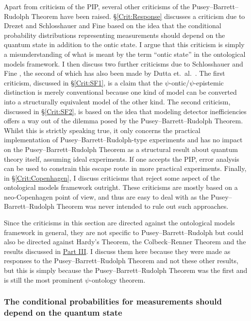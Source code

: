 \documentclass[DIV=calc,paper=a4,fontsize=11pt,twocolumn]{scrartcl} %
\theoremstyle{definition}
\theoremstyle{plain}
\begin{document}
Apart from criticism of the PIP, several other criticisms of the
Pusey--Barrett--Rudolph Theorem have been raised.
\S\ref{Crit:Response} discusses a criticism due to Drezet
\cite{Drezet2012, Drezet2012a} and Schlosshauer and Fine
\cite{Schlosshauer2012} based on the idea that the conditional
probability distributions representing measurements should depend on
the quantum state in addition to the ontic state.  I argue that this
criticism is simply a misunderstanding of what is meant by the term
``ontic state'' in the ontological models framework.  I then discuss
two further criticisms due to Schlosshauer and Fine
\cite{Schlosshauer2012}, the second of which has also been made by
Dutta et.\ al.\ \cite{Dutta2014}.  The first criticism, discussed in
\S\ref{Crit:SF1}, is a claim that the $\psi$-ontic/$\psi$-epistemic
distinction is merely conventional because one kind of model can be
converted into a structurally equivalent model of the other kind.  The
second criticism, discussed in \S\ref{Crit:SF2}, is based on the idea
that modeling detector inefficiencies offers a way out of the dilemma
posed by the Pusey--Barrett--Rudolph Theorem.  Whilst this is strictly
speaking true, it only concerns the practical implementation of
Pusey--Barrett--Rudolph-type experiments and has no impact on the
Pusey--Barrett--Rudolph Theorem as a structural result about quantum
theory itself, assuming ideal experiments.  If one accepts the PIP,
error analysis can be used to constrain this escape route in more
practical experiments.  Finally, in \S\ref{Crit:Copenhagen}, I discuss
criticisms that reject some aspect of the ontological models framework
outright.  These criticisms are mostly based on a neo-Copenhagen point
of view, and thus are easy to deal with as the Pusey--Barrett--Rudolph
Theorem was never intended to rule out such approaches.

Since the criticisms in this section are directed against the
ontological models framework in general, they are not specific to Pusey--Barrett--Rudolph
but could also be directed against Hardy's Theorem, the Colbeck--Renner
Theorem and the results discussed in \hyperref[Beyond]{Part III}.  I discuss
them here because they were made as responses to the Pusey--Barrett--Rudolph Theorem and
not these other results, but this is simply because the Pusey--Barrett--Rudolph Theorem
was the first and is still the most prominent $\psi$-ontology theorem.

\subsubsection{The conditional probabilities for measurements should
depend on the quantum state}
\end{document}
